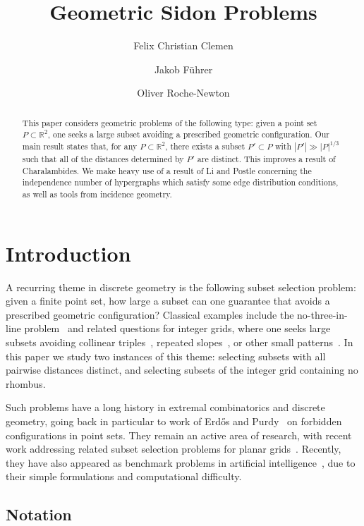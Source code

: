 \documentclass[11pt,oneside]{amsart}
\title[Geometric Sidon Problems]{Geometric Sidon Problems}
\author{}
\author{Felix Christian Clemen}
\author{Jakob Führer}
\author{Oliver Roche-Newton}
\numberwithin{exercise}{subsection}
\begin{document}
\begin{abstract}
This paper considers geometric problems of the following type: given a point set $P \subset \mathbb R^2$, one seeks a large subset avoiding a prescribed geometric
configuration. Our main result states that, for any $P \subset \mathbb R^2$, there exists a subset $P' \subset P$ with $|P'| \gg |P|^{1/3}$ such that all of the distances determined by $P'$ are distinct. This improves a result of Charalambides. We make heavy use of a result of Li and Postle concerning the independence number of hypergraphs which satisfy some edge distribution conditions, as well as tools from incidence geometry.

\end{abstract}
\maketitle



\section{Introduction}
A recurring theme in discrete geometry is the following subset selection problem:
given a finite point set, how large a subset can one guarantee that avoids a prescribed geometric configuration? Classical examples include the no-three-in-line problem~\cite{Dudeney1917PuzzleWithPawns} and related questions for integer grids, where one seeks large subsets avoiding collinear triples~\cite{Erdos1986}, repeated slopes~\cite{ErdosGrahamRuzsaTaylor1992Dots}, or other small patterns~\cite{JanosikNadorNagySimon2026}. In this paper we study two instances of this theme: selecting subsets with all pairwise distances distinct, and selecting subsets of the integer grid containing no rhombus.

Such problems have a long history in extremal combinatorics and discrete geometry, going back in particular to work of Erdős and Purdy~\cite{ErdosPurdy1971ExtremalGeometry} on forbidden configurations in point sets. They remain an active area of research,
with recent work addressing related subset selection problems for planar grids~\cite{BaloghSubsetSelection,Ghosal2026}. Recently, they have also appeared as benchmark problems in artificial intelligence~\cite{Wagner,georgiev2025mathematical}, due to their simple formulations and computational difficulty.

 
\subsection*{Notation}
\end{document}
